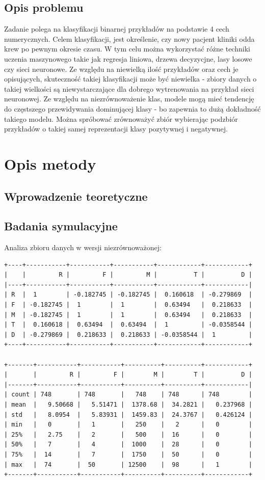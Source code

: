 \documentclass[11pt, a4paper, notitlepage]{report}
\begin{document}
\section{Opis problemu}
	Zadanie polega na klasyfikacji binarnej przykładów na podstawie 4 cech numerycznych. Celem klasyfikacji, jest określenie, czy nowy pacjent kliniki odda krew po pewnym okresie czasu. W tym celu można wykorzystać różne techniki uczenia maszynowego 
	takie jak regresja liniowa, drzewa decyzycjne, lasy losowe czy sieci neuronowe. Ze względu na niewielką ilość przykładów oraz cech je opisujących, skuteczność takiej klasyfikacji może być niewielka - zbiory danych o takiej wielkości są niewystarczające 
	dla dobrego wytrenowania na przykład sieci neuronowej. Ze względu na niezrównoważenie klas, modele mogą mieć tendencję do częstszego przewidywania dominującej klasy - bo zapewnia to dużą dokładność takiego modelu. Można spróbować zrównoważyć
	zbiór wybierając podzbiór przykładów o takiej samej reprezentacji klasy pozytywnej i negatywnej.

\chapter{Opis metody}
\section{Wprowadzenie teoretyczne}
\lipsum[1]

\section{Badania symulacyjne}
Analiza zbioru danych w wersji niezrównoważonej:
\begin{verbatim}
+----+-----------+-----------+-----------+------------+------------+
|    |         R |         F |         M |          T |          D |
|----+-----------+-----------+-----------+------------+------------|
| R  |  1        | -0.182745 | -0.182745 |  0.160618  | -0.279869  |
| F  | -0.182745 |  1        |  1        |  0.63494   |  0.218633  |
| M  | -0.182745 |  1        |  1        |  0.63494   |  0.218633  |
| T  |  0.160618 |  0.63494  |  0.63494  |  1         | -0.0358544 |
| D  | -0.279869 |  0.218633 |  0.218633 | -0.0358544 |  1         |
+----+-----------+-----------+-----------+------------+------------+

+-------+-----------+-----------+----------+----------+------------+
|       |         R |         F |        M |        T |          D |
|-------+-----------+-----------+----------+----------+------------|
| count | 748       | 748       |   748    | 748      | 748        |
| mean  |   9.50668 |   5.51471 |  1378.68 |  34.2821 |   0.237968 |
| std   |   8.0954  |   5.83931 |  1459.83 |  24.3767 |   0.426124 |
| min   |   0       |   1       |   250    |   2      |   0        |
| 25%   |   2.75    |   2       |   500    |  16      |   0        |
| 50%   |   7       |   4       |  1000    |  28      |   0        |
| 75%   |  14       |   7       |  1750    |  50      |   0        |
| max   |  74       |  50       | 12500    |  98      |   1        |
+-------+-----------+-----------+----------+----------+------------+
\end{verbatim}
\end{document}
